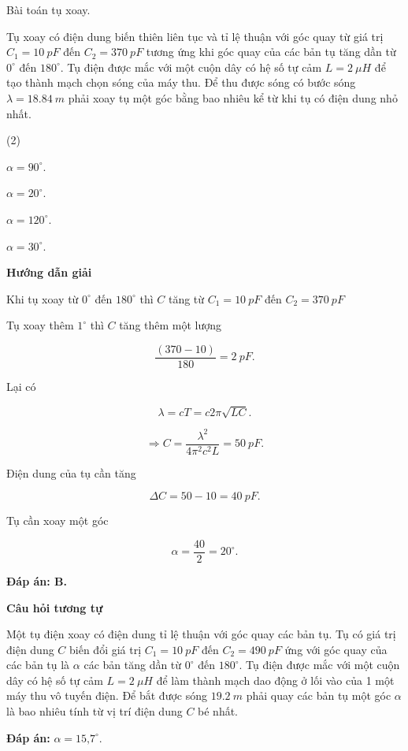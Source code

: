 \begin{dang}{Bài toán tụ xoay.}
{		Tụ xoay có điện dung biến thiên liên tục và tỉ lệ thuận với góc quay từ giá trị $C_1 = \SI{10}{pF}$ đến $C_2 = \SI{370}{pF}$ tương ứng khi góc quay của các bản tụ tăng dần từ $0^\circ$ đến $180^\circ$. Tụ điện được mắc với một cuộn dây có hệ số tự cảm $L = \SI{2}{\mu H}$ để tạo thành mạch chọn sóng của máy thu. Để thu được sóng có bước sóng $\lambda = \SI{18,84}{m}$ phải xoay tụ một góc bằng bao nhiêu kể từ khi tụ có điện dung nhỏ nhất.
		\begin{mcq}(2)
		\item $\alpha = 90^\circ$.             
		\item $\alpha = 20^\circ$.
		\item $\alpha = 120^\circ$.              
		\item $\alpha = 30^\circ$.
		\end{mcq}
		
	}
	{	\begin{center}
			\textbf{Hướng dẫn giải}
		\end{center}
		
		Khi tụ xoay từ $0^\circ$ đến $180^\circ$ thì $C$ tăng từ $C_1 = \SI{10}{pF}$ đến $C_2 = \SI{370}{pF}$
		
		Tụ xoay thêm $1^\circ$ thì $C$ tăng thêm một lượng 
		
		$$\dfrac{(370-10)}{180} = \SI{2}{pF}.$$
		
		Lại có 
		
		$$\lambda = cT = c2 \pi \sqrt{LC}.$$
		
		$$\Rightarrow C = \dfrac{\lambda^2}{4\pi^2 c^2 L} = \SI{50}{pF}.$$
		
		Điện dung của tụ cần tăng 
		
		$$\Delta C = 50 - 10 = \SI{40}{pF}.$$
		
		Tụ cần xoay một góc 
		
		$$\alpha = \dfrac{40}{2} = 20^\circ.$$
		
		\textbf{Đáp án: B.}
		
		\begin{center}
			\textbf{Câu hỏi tương tự}
		\end{center}
		
		Một tụ điện xoay có điện dung tỉ lệ thuận với góc quay các bản tụ. Tụ có giá trị điện dung $C$ biến đổi giá trị $C_1 = \SI{10}{pF}$ đến $C_2 = \SI{490}{pF}$ ứng với góc quay của các bản tụ là $\alpha$ các bản tăng dần từ $0^\circ$ đến $180^\circ$. Tụ điện được mắc với một cuộn dây có hệ số tự cảm $L = \SI{2}{\mu H}$ để làm thành mạch dao động ở lối vào của 1 một máy thu vô tuyến điện. Để bắt được sóng $\SI{19,2}{m}$ phải quay các bản tụ một góc $\alpha$ là bao nhiêu tính từ vị trí điện dung $C$ bé nhất.
		
		\textbf{Đáp án:} $\alpha = \text{15,7}^\circ.$
	}
	
\end{dang}
